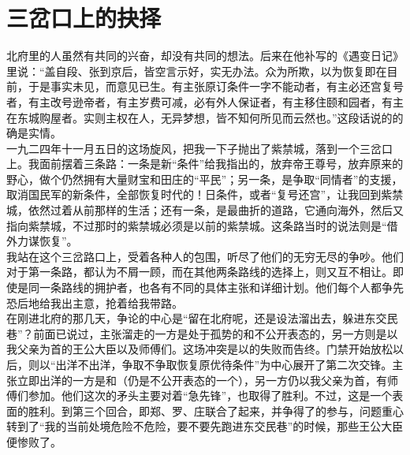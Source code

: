 \fancyhead[RO]{\thepage} %
\fancyhead[LE]{\thepage} %
\chapter*{三岔口上的抉择}
北府里的人虽然有共同的兴奋，却没有共同的想法。后来在他补写的《遇变日记》里说：“盖自段、张到京后，皆空言示好，实无办法。众为所欺，以为恢复即在目前，于是事实未见，而意见已生。有主张原订条件一字不能动者，有主必还宫复号者，有主改号逊帝者，有主岁费可减，必有外人保证者，有主移住颐和园者，有主在东城购屋者。实则主权在人，无异梦想，皆不知何所见而云然也。”这段话说的的确是实情。\\

一九二四年十一月五日的这场旋风，把我一下子抛出了紫禁城，落到一个三岔口上。我面前摆着三条路：一条是新“条件”给我指出的，放弃帝王尊号，放弃原来的野心，做个仍然拥有大量财宝和田庄的“平民”；另一条，是争取“同情者”的支援，取消国民军的新条件，全部恢复时代的！日条件，或者“复号还宫”，让我回到紫禁城，依然过着从前那样的生活；还有一条，是最曲折的道路，它通向海外，然后又指向紫禁城，不过那时的紫禁城必须是以前的紫禁城。这条路当时的说法则是“借外力谋恢复”。\\

我站在这个三岔路口上，受着各种人的包围，听尽了他们的无穷无尽的争吵。他们对于第一条路，都认为不屑一顾，而在其他两条路线的选择上，则又互不相让。即使是同一条路线的拥护者，也各有不同的具体主张和详细计划。他们每个人都争先恐后地给我出主意，抢着给我带路。\\

在刚进北府的那几天，争论的中心是“留在北府呢，还是设法溜出去，躲进东交民巷”？前面已说过，主张溜走的一方是处于孤势的和不公开表态的，另一方则是以我父亲为首的王公大臣以及师傅们。这场冲突是以的失败而告终。门禁开始放松以后，则以“出洋不出洋，争取不争取恢复原优待条件”为中心展开了第二次交锋。主张立即出洋的一方是和（仍是不公开表态的一个），另一方仍以我父亲为首，有师傅们参加。他们这次的矛头主要对着“急先锋”，也取得了胜利。不过，这是一个表面的胜利。到第三个回合，即郑、罗、庄联合了起来，并争得了的参与，问题重心转到了“我的当前处境危险不危险，要不要先跑进东交民巷”的时候，那些王公大臣便惨败了。\\

